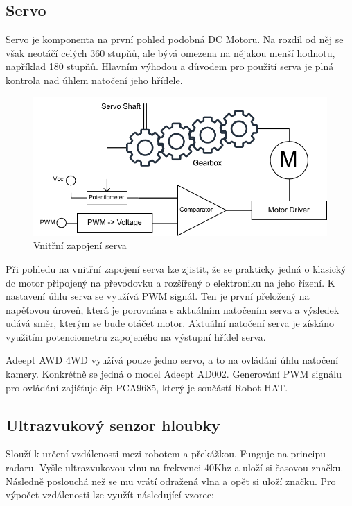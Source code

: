 \subsection*{Servo}
Servo je komponenta na první pohled podobná DC Motoru. Na rozdíl od něj se však neotáčí celých 360 stupňů, ale bývá omezena na nějakou menší hodnotu, například 180 stupňů. Hlavním výhodou a důvodem pro použití serva je plná kontrola nad úhlem natočení jeho hřídele. \cite{embeded_robotics}

\begin{figure}[h!]
	\centering
	\includegraphics[scale=0.9]{obrazky-figures/servo.pdf}
	\caption{Vnitřní zapojení serva}
	\label{}
\end{figure}

Při pohledu na vnitřní zapojení serva lze zjistit, že se prakticky jedná o klasický dc motor připojený na převodovku a rozšířený o elektroniku na jeho řízení. K nastavení úhlu serva se využívá PWM signál. Ten je první přeložený na napěťovou úroveň, která je porovnána s aktuálním natočením serva a výsledek udává směr, kterým se bude otáčet motor. Aktuální natočení serva je získáno využitím potenciometru zapojeného na výstupní hřídel serva. \cite{embeded_robotics}

Adeept AWD 4WD využívá pouze jedno servo, a to na ovládání úhlu natočení kamery. Konkrétně se jedná o model Adeept AD002. Generování PWM signálu pro ovládání zajišťuje čip PCA9685, který je součástí Robot HAT.

\subsection*{Ultrazvukový senzor hloubky}
Slouží k určení vzdálenosti mezi robotem a překážkou. Funguje na principu radaru. Vyšle ultrazvukovou vlnu na frekvenci 40Khz a uloží si časovou značku. Následně poslouchá než se mu vrátí odražená vlna a opět si uloží značku.
Pro výpočet vzdálenosti lze využít následující vzorec:

